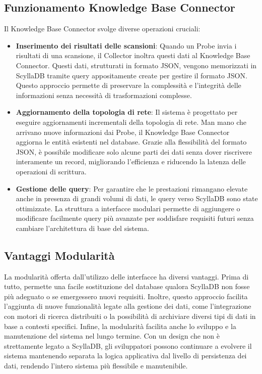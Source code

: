 \documentclass[target=bach,aauheader=,style=]{thud}
\begin{document}
\subsection{Funzionamento Knowledge Base Connector}
Il Knowledge Base Connector svolge diverse operazioni cruciali:

\begin{itemize}
  \item \textbf{Inserimento dei risultati delle scansioni}: Quando un Probe invia i risultati di una scansione, il Collector inoltra questi dati al Knowledge Base Connector. Questi dati, strutturati in formato JSON, vengono memorizzati in ScyllaDB tramite query appositamente create per gestire il formato JSON. Questo approccio permette di preservare la complessità e l'integrità delle informazioni senza necessità di trasformazioni complesse.
  \item \textbf{Aggiornamento della topologia di rete}: Il sistema è progettato per eseguire aggiornamenti incrementali della topologia di rete. Man mano che arrivano nuove informazioni dai Probe, il Knowledge Base Connector aggiorna le entità esistenti nel database. Grazie alla flessibilità del formato JSON, è possibile modificare solo alcune parti dei dati senza dover riscrivere interamente un record, migliorando l'efficienza e riducendo la latenza delle operazioni di scrittura.
  \item \textbf{Gestione delle query}: Per garantire che le prestazioni rimangano elevate anche in presenza di grandi volumi di dati, le query verso ScyllaDB sono state ottimizzate. La struttura a interfacce modulari permette di aggiungere o modificare facilmente query più avanzate per soddisfare requisiti futuri senza cambiare l'architettura di base del sistema.
\end{itemize}



\subsection{Vantaggi Modularità}
La modularità offerta dall'utilizzo delle interfacce ha diversi vantaggi. Prima di tutto, permette una facile sostituzione del database qualora ScyllaDB non fosse più adeguato o se emergessero nuovi requisiti. Inoltre, questo approccio facilita l’aggiunta di nuove funzionalità legate alla gestione dei dati, come l’integrazione con motori di ricerca distribuiti o la possibilità di archiviare diversi tipi di dati in base a contesti specifici.
\newline
Infine, la modularità facilita anche lo sviluppo e la manutenzione del sistema nel lungo termine. Con un design che non è strettamente legato a ScyllaDB, gli sviluppatori possono continuare a evolvere il sistema mantenendo separata la logica applicativa dal livello di persistenza dei dati, rendendo l'intero sistema più flessibile e manutenibile.
\end{document}
